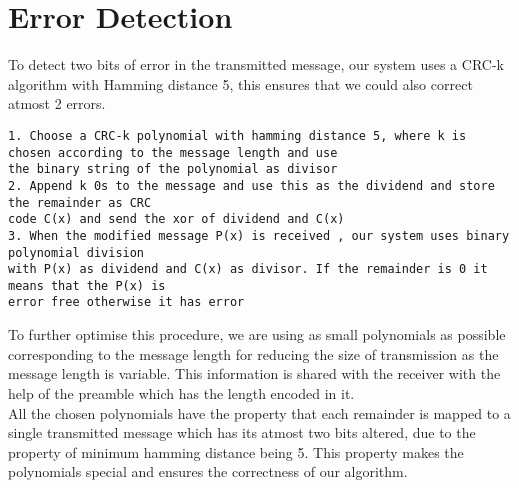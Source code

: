 \documentclass[11pt]{article}
\begin{document}
\section{Error Detection}
To detect two bits of error in the transmitted message, our system uses a CRC-k algorithm with Hamming distance 5, this ensures that we could also correct atmost 2 errors.
\begin{tcolorbox}[colback=black!10!white, colframe=black, title=Error Detection Algorithm ]
    \begin{verbatim}
1. Choose a CRC-k polynomial with hamming distance 5, where k is chosen according to the message length and use
the binary string of the polynomial as divisor
2. Append k 0s to the message and use this as the dividend and store the remainder as CRC 
code C(x) and send the xor of dividend and C(x)
3. When the modified message P(x) is received , our system uses binary polynomial division
with P(x) as dividend and C(x) as divisor. If the remainder is 0 it means that the P(x) is 
error free otherwise it has error\end{verbatim}
\end{tcolorbox}
To further optimise this procedure, we are using as small polynomials as possible corresponding to the message length for reducing the size of transmission as the message length is variable. This information is shared with the receiver with the help of the preamble which has the length encoded in it. \\
All the chosen polynomials have the property that each remainder is mapped to a single transmitted message which has its atmost two bits altered, due to the property of minimum hamming distance being 5. This property makes the polynomials special and ensures the correctness of our algorithm.
\end{document}
